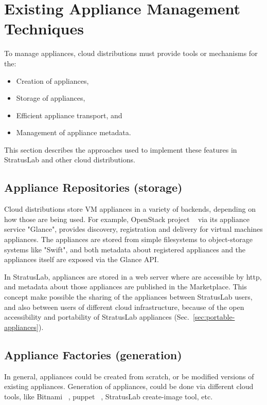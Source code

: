 \section{Existing Appliance Management Techniques}
\label{sec:other-approaches}

To manage appliances, cloud distributions must provide tools or
mechanisms for the:
\begin{itemize}
\item Creation of appliances,
\item Storage of appliances,
\item Efficient appliance transport, and
\item Management of appliance metadata.
\end{itemize}
This section describes the approaches used to implement these features
in StratusLab and other cloud distributions.

\subsection{Appliance Repositories (storage)}

Cloud distributions store VM appliances in a variety of backends, 
depending on how those are being used. For example, OpenStack project ~\cite{openstack} 
via its appliance service "Glance", provides discovery, registration and delivery for 
virtual machines appliances. The appliances are stored from simple filesystems to 
object-storage systems like "Swift", and both metadata about registered appliances 
and the appliances itself are exposed via the Glance API.

In StratusLab, appliances are stored in a web server where are accessible by http, and
metadata about those appliances are published in the Marketplace. This concept make possible 
the sharing of the appliances between StratusLab users, and also between users of different cloud 
infrastructure, because of the open accessibility and portability of StratusLab appliances (Sec.~\ref{sec:portable-appliances}). 

\subsection{Appliance Factories (generation)}
In general, appliances could be created from scratch, or be modified versions of existing appliances.
Generation of appliances, could be done via different
cloud tools, like Bitnami ~\cite{bitnami}, puppet ~\cite{puppet}, StratusLab create-image tool,
etc.

